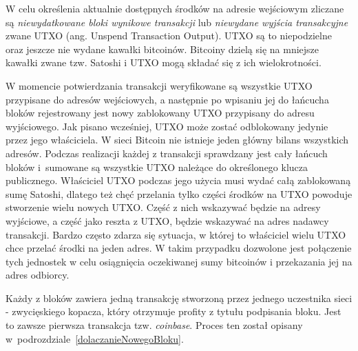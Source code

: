 \documentclass[12pt, twoside, final, openany]{mgr}
\begin{document}
\indent W celu określenia aktualnie dostępnych środków na adresie wejściowym zliczane są \textit{niewydatkowane bloki wynikowe transakcji} lub \textit{niewydane wyjścia transakcyjne} zwane UTXO (ang. Unspend Transaction Output). UTXO są to niepodzielne oraz jeszcze nie wydane kawałki bitcoinów. Bitcoiny dzielą się na mniejsze kawałki zwane tzw. Satoshi i UTXO mogą składać się z ich wielokrotności. 

\indent W momencie potwierdzania transakcji weryfikowane są wszystkie UTXO przypisane do adresów wejściowych, a następnie po wpisaniu jej do łańcucha bloków rejestrowany jest nowy zablokowany UTXO przypisany do adresu wyjściowego. Jak pisano wcześniej, UTXO może zostać odblokowany jedynie przez jego właściciela. W sieci Bitcoin nie istnieje jeden główny bilans wszystkich adresów. Podczas realizacji każdej z transakcji sprawdzany jest cały łańcuch bloków i~sumowane są wszystkie UTXO należące do określonego klucza publicznego. Właściciel UTXO podczas jego użycia musi wydać całą zablokowaną sumę Satoshi, dlatego też chęć przelania tylko części środków na UTXO powoduje stworzenie wielu nowych UTXO. Część z nich wskazywać będzie na adresy wyjściowe, a część jako reszta z UTXO, będzie wskazywać na adres nadawcy transakcji. Bardzo często zdarza się sytuacja, w której to właściciel wielu UTXO chce przelać środki na jeden adres. W takim przypadku dozwolone jest połączenie tych jednostek w celu osiągnięcia oczekiwanej sumy bitcoinów i przekazania jej na adres odbiorcy. 

\indent Każdy z bloków zawiera jedną transakcję stworzoną przez jednego uczestnika sieci - zwycięskiego kopacza, który otrzymuje profity z tytułu podpisania bloku. Jest to zawsze pierwsza transakcja tzw. \textit{coinbase}. Proces ten został opisany w~podrozdziale~\ref{dolaczanieNowegoBloku}.
\end{document}
